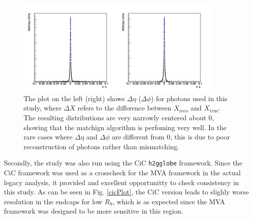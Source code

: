 \documentclass[10pt]{article}
\begin{document}
\begin{figure}[h!]
 \centering
\includegraphics[width=0.9\textwidth]{"Delta"}
\caption{ The plot on the left (right) shows $\Delta \eta$ ($\Delta \phi$) for photons used in this study, where $\Delta X$ refers to the difference between $X_{\text{reco}}$ and $X_{\text{true}}$. The resulting distributions are very narrowly centered about 0, showing that the matchign algorithm is perfoming very well. In the rare cases where $\Delta \eta$ and $\Delta \phi$ are different from 0, this is due to poor reconstruction of photons rather than mismatching.}
\label{deltaPlots}
\end{figure}
Secondly, the study was also run using the CiC \texttt{h2gglobe} framework. Since the CiC framework was used as a crosscheck for the MVA framework in the actual legacy analysis, it provided and excellent opportunitty to check consistency in this study. As can be seen in Fig. \ref{cicPlot}, the CiC version leads to slighly worse resolution in the endcaps for low $R_9$, which is as expected since the MVA framework was designed to be more sensitive in this region.
\end{document}
